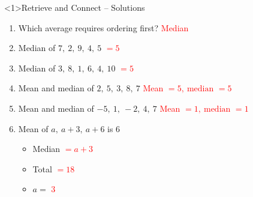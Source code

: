 \documentclass{beamer}
\begin{document}
\begin{frame}<1>{Retrieve and Connect -- Solutions}
\vspace{-0.8em}

\footnotesize
\begin{enumerate}\itemsep2pt
  \item Which average requires ordering first?  
        \textcolor{red}{Median}
  \item Median of $7,\ 2,\ 9,\ 4,\ 5$  
        \textcolor{red}{$=5$}
  \item Median of $3,\ 8,\ 1,\ 6,\ 4,\ 10$  
        \textcolor{red}{$=5$}
  \item Mean and median of $2,\ 5,\ 3,\ 8,\ 7$  
        \textcolor{red}{Mean $=5,\ \text{median }=5$}
  \item Mean and median of $-5,\ 1,\ -2,\ 4,\ 7$  
        \textcolor{red}{Mean $=1,\ \text{median }=1$}
  \item Mean of $a,\ a+3,\ a+6$ is $6$
        \begin{itemize}\footnotesize
          \item Median \textcolor{red}{$=a+3$}
          \item Total \textcolor{red}{$=18$}
          \item $a=$ \textcolor{red}{$3$}
        \end{itemize}
\end{enumerate}
\end{frame}
\end{document}
